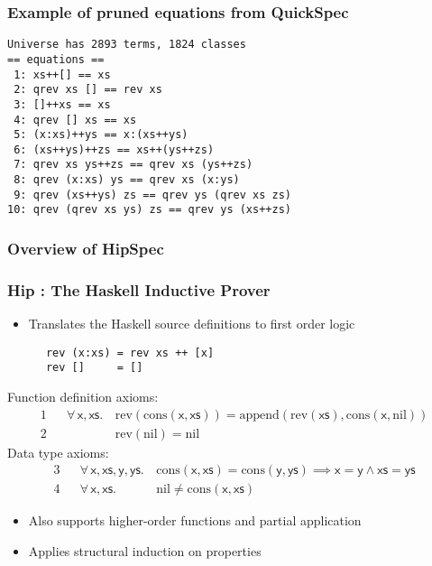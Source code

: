\documentclass[serif,professionalfont]{beamer}
\newcommand\faa[2]{ \forall \, #1 , #2 . \,}
\newcommand\faaaa[4]{ \forall \, #1 , #2 , #3 , #4 . \,}
\newcommand\up[0]{\vspace{-\baselineskip}}
\begin{document}
\begin{frame}[fragile]
  \frametitle{Example of pruned equations from QuickSpec}

\begin{verbatim}
Universe has 2893 terms, 1824 classes
== equations ==
 1: xs++[] == xs
 2: qrev xs [] == rev xs
 3: []++xs == xs
 4: qrev [] xs == xs
 5: (x:xs)++ys == x:(xs++ys)
 6: (xs++ys)++zs == xs++(ys++zs)
 7: qrev xs ys++zs == qrev xs (ys++zs)
 8: qrev (x:xs) ys == qrev xs (x:ys)
 9: qrev (xs++ys) zs == qrev ys (qrev xs zs)
10: qrev (qrev xs ys) zs == qrev ys (xs++zs)
\end{verbatim}

\end{frame}

\begin{frame}
  \frametitle{Overview of HipSpec}
  \def\hltrans{} %
  
  \undef\hltrans
\end{frame}

\newcommand\fn[1]{\mathrm{#1}}
\newcommand\fcons   [2]{\fn{cons}(#1,#2)}
\newcommand\frev    [1]{\fn{rev}(#1)}
\newcommand\fxs     [0]{\textsf{xs}}
\newcommand\fx      [0]{\textsf{x}}
\newcommand\fys     [0]{\textsf{ys}}
\newcommand\fy      [0]{\textsf{y}}
\newcommand\fappend [2]{\fn{append}(#1,#2)}
\newcommand\fnil    [0]{\fn{nil}}

\begin{frame}[fragile]
  \frametitle{Hip : The Haskell Inductive Prover}

  \begin{itemize}
    \item Translates the Haskell source definitions to first order logic
\up
  \end{itemize}
  \begin{verbatim}
      rev (x:xs) = rev xs ++ [x]
      rev []     = []
  \end{verbatim}
\up
Function definition axioms:
\begin{align*}
1 && \faa{\fx}{\fxs} & \frev{\fcons{\fx}{\fxs}} = \fappend{\frev{\fxs}}{\fcons{\fx}{\fnil}} \\
2 &&                 & \frev{\fnil}             = \fnil
\end{align*}
Data type axioms:
\begin{align*}
3 && \faaaa{\fx}{\fxs}{\fy}{\fys} & \fcons{\fx}{\fxs} = \fcons{\fy}{\fys} \implies \fx = \fy \land \fxs = \fys \\
4 && \faa{\fx}{\fxs} & \fnil \neq \fcons{\fx}{\fxs}
\end{align*}
\up
  \begin{itemize}
  \item Also supports higher-order functions and partial application
  \item Applies structural induction on properties
  \end{itemize}

\end{frame}
\end{document}
